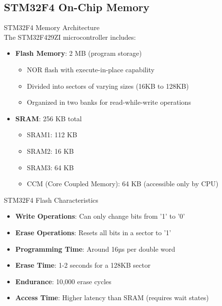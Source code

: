 \subsection{STM32F4 On-Chip Memory}

\begin{concept}{STM32F4 Memory Architecture}\\
The STM32F429ZI microcontroller includes:
\begin{itemize}
    \item \textbf{Flash Memory}: 2 MB (program storage)
    \begin{itemize}
        \item NOR flash with execute-in-place capability
        \item Divided into sectors of varying sizes (16KB to 128KB)
        \item Organized in two banks for read-while-write operations
    \end{itemize}
    \item \textbf{SRAM}: 256 KB total
    \begin{itemize}
        \item SRAM1: 112 KB
        \item SRAM2: 16 KB
        \item SRAM3: 64 KB
        \item CCM (Core Coupled Memory): 64 KB (accessible only by CPU)
    \end{itemize}
\end{itemize}
\end{concept}

\begin{definition}{STM32F4 Flash Characteristics}
\begin{itemize}
    \item \textbf{Write Operations}: Can only change bits from '1' to '0'
    \item \textbf{Erase Operations}: Resets all bits in a sector to '1'
    \item \textbf{Programming Time}: Around 16µs per double word
    \item \textbf{Erase Time}: 1-2 seconds for a 128KB sector
    \item \textbf{Endurance}: 10,000 erase cycles
    \item \textbf{Access Time}: Higher latency than SRAM (requires wait states)
\end{itemize}
\end{definition}



